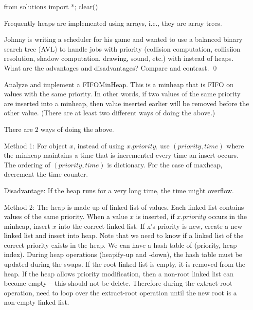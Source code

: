\begin{python0}
from solutions import *; clear()
\end{python0}

Frequently heaps are implemented using arrays,
i.e., they are array trees.

\newpage
\begin{ex}
  Johnny is writing
  a scheduler for his game
  and wanted to use a balanced binary search tree (AVL)
  to handle jobs with priority
  (collision computation, collisiion resolution, shadow computation,
  drawing, sound, etc.) with
  instead of heaps.
  What are the advantages and disadvantages?
  Compare and contrast.
  \qed
\end{ex}

\newpage
\begin{ex}
  Analyze and implement a FIFOMinHeap.
  This is a minheap that is FIFO on values with the
  same priority.
  In other words, if two values
  of the same priority
  are inserted into a minheap,
  then value inserted earlier will be
  removed before the other value.
  (There are at least two different ways of doing
  the above.)
\end{ex}


There are 2 ways of doing the above.

Method 1:
For object $x$, instead of using $x.priority$,
use $(priority, time)$ where the minheap maintains
a time that is incremented every time
an insert occurs. The ordering of $(priority, time)$
is dictionary.
For the case of maxheap, decrement the time counter.

Disadvantage: If the heap runs for a very long time,
the time might overflow.

Method 2:
The heap is made up of linked list of values.
Each linked list contains values of the same priority.
When a value $x$ is inserted, if $x.priority$ occurs in
the minheap, insert $x$ into the correct linked list.
If x's priority is new, create a new linked list and
insert into heap.
Note that we need to know if a linked list of the
correct priority exists in the heap.
We can have a hash table of (priority, heap index).
During heap operations (heapify-up and -down), the
hash table must be updated during the swaps.
If the root linked list is empty, it is removed from the heap.
If the heap allows priority modification, then
a non-root linked list can become empty -- this should not be
delete.
Therefore during the extract-root operation,
need to loop over the extract-root operation until
the new root is a non-empty linked list.

